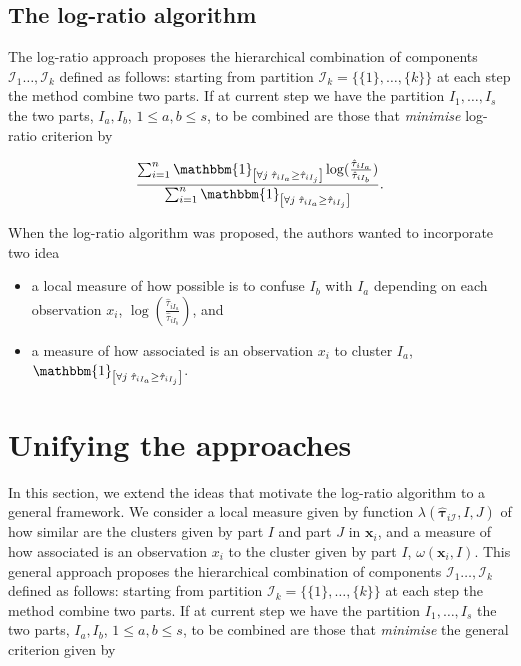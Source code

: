 \documentclass[10pt, a4paper]{article}
\newcommand{\m}[1]{\boldsymbol{#1}}
\begin{document}
\subsection*{The log-ratio algorithm}

The log-ratio approach \citep{} proposes the hierarchical combination of components $\mathcal{I}_1 \dots, \mathcal{I}_k$ defined as follows: starting from partition $\mathcal{I}_k = \{\{1\},\dots, \{k\}\}$ at each step the method combine two parts. If at current step we have the partition  $I_1, \dots, I_s$ the two parts, $I_a, I_b$, $1 \leq a,b \leq s$,  to be combined are those that \emph{minimise} log-ratio criterion by

\[
\frac{\sum_{i=1}^n \mathbbm{1}_{\left[ \forall j\; \hat{\tau}_{i I_{a}} \geq \hat{\tau}_{iI_j} \right]} \log( \frac{ \hat{\tau}_{iI_a} }{ \hat{\tau}_{iI_b} })}{\sum_{i=1}^n \mathbbm{1}_{\left[ \forall j\; \hat{\tau}_{i I_{a}} \geq \hat{\tau}_{iI_j} \right]}}.
\]

When the log-ratio algorithm was proposed, the authors wanted to incorporate two idea

\begin{itemize}
\item a local measure of how possible is to confuse $I_b$ with $I_a$ depending on each observation $x_i$, $\log( \frac{ \hat{\tau}_{iI_a} }{ \hat{\tau}_{iI_b} })$, and
\item a measure of how associated is an observation $x_i$ to cluster $I_a$, $\mathbbm{1}_{\left[ \forall j\; \hat{\tau}_{i I_{a}} \geq \hat{\tau}_{iI_j} \right]}$.
\end{itemize}

\section{Unifying the approaches}

In this section, we extend the ideas that motivate the log-ratio algorithm to a general framework. We consider a local measure given by function $\lambda(\hat{\m\tau}_{i \mathcal{I}}, I, J)$ of how similar are the clusters given by part $I$ and part $J$ in $\m x_i$, and a measure of how associated is an observation $x_i$ to the cluster given by part $I$, $\omega(\m x_i, I)$. This general approach proposes the hierarchical combination of components $\mathcal{I}_1 \dots, \mathcal{I}_k$ defined as follows: starting from partition $\mathcal{I}_k = \{\{1\},\dots, \{k\}\}$ at each step the method combine two parts. If at current step we have the partition  $I_1, \dots, I_s$ the two parts, $I_a, I_b$, $1 \leq a,b \leq s$,  to be combined are those that \emph{minimise} the general criterion given by
\end{document}
